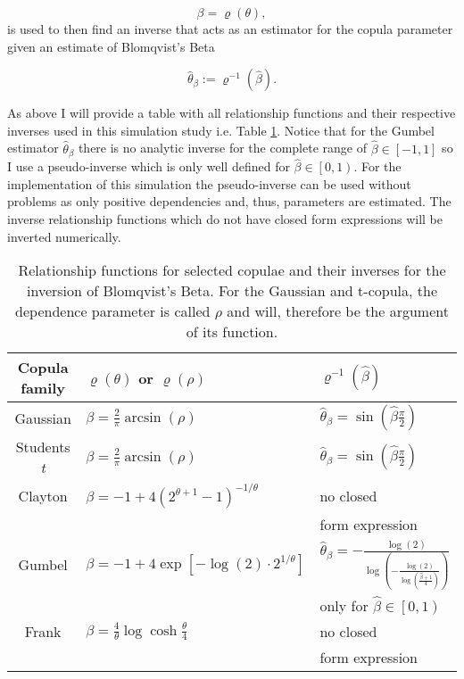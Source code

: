 \begin{equation*}
	\beta = \varrho (\theta), 
\end{equation*}
%
is used to then find an inverse that acts as an estimator for the copula parameter given an estimate of Blomqvist's Beta

\begin{equation}
	\hat{\theta}_\beta := \varrho^{-1}(\hat{\beta}). 
\end{equation}

As above I will provide a table with all relationship functions and their respective inverses used in this simulation study i.e. Table \ref{iBeta-rel-funcs}. Notice that for the Gumbel estimator $\hat{\theta}_\beta$ there is no analytic inverse for the complete range of $\hat{\beta} \in\left[-1,1 \right] $ so I use a pseudo-inverse which is only well defined for $\hat{\beta} \in\left[0,1 \right)$. For the implementation of this simulation the pseudo-inverse can be used without problems as only positive dependencies and, thus, parameters are estimated. The inverse relationship functions which do not have closed form expressions will be inverted numerically.
\begin{table}

	\centering
	{\renewcommand{\arraystretch}{1.4}
		\begin{tabular}{c|l|l}
			\hline
			Copula family & $\varrho (\theta)$ or $\varrho (\rho)$ & $\varrho^{-1}(\hat{\beta})$ \\
			\hline
			\hline
			Gaussian & $\beta=\frac{2}{\pi} \arcsin (\rho)$ & $\hat{\theta}_\beta =\sin(\hat{\beta}\frac{\pi}{2})$ \\
			\hline
			Students \textit{t}& $\beta=\frac{2}{\pi} \arcsin (\rho)$ & $\hat{\theta}_\beta =\sin(\hat{\beta}\frac{\pi}{2})$ \\
			\hline
			Clayton & $\beta = -1+4(2^{\theta +1}-1)^{-1 / \theta}$  & no closed \\
			& & form expression\\
			\hline
			Gumbel & $\beta = -1+4\exp\left[ -\log(2) \cdot 2^{1/\theta} \right] $ &  $\hat{\theta}_\beta = -\frac{\log (2)}{\log \left(-\frac{\log (2)}{\log \left(\frac{\hat{\beta}+1}{4}\right)}\right)}$ \\
			& & only for $\hat{\beta} \in \left[ 0,1 \right) $ \\
			\hline
			Frank & $\beta = \frac{4}{\theta}\log\cosh \frac{\theta}{4}$ & no closed  \\
			& & form expression \\
		\end{tabular}
	}
	\caption[Relationship functions and inverses for the inversion of Blomqvist's Beta]{Relationship functions for selected copulae and their inverses for the inversion of Blomqvist's Beta. For the Gaussian and t-copula, the dependence parameter is called $\rho$ and will, therefore be the argument of its function.}
	\label{iBeta-rel-funcs}
\end{table}


